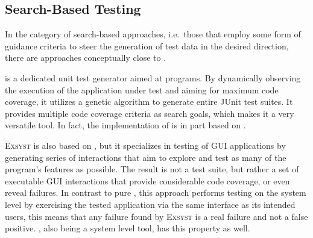 \subsection{Search-Based Testing}
In the category of search-based approaches, i.e.\ those that employ some form of guidance criteria to steer the
generation of test data in the desired direction, there are approaches conceptually close to \xmlmate.

\evosuite{}\cite{fraser2013whole} is a dedicated unit test generator aimed at \java programs. By
dynamically observing the execution of the application under test and aiming for maximum code coverage, it
utilizes a genetic algorithm to generate entire JUnit test suites. It provides multiple code coverage
criteria as search goals, which makes it a very versatile tool. In fact, the implementation of \xmlmate is
in part based on \evosuite.

\textsc{Exsyst}\cite{gross-issta2012} is also based on \evosuite, but it specializes in testing of \java
GUI applications by generating series of interactions that aim to explore and test as many of the program's
features as possible. The result is not a test suite, but rather a set of executable GUI interactions that
provide considerable code coverage, or even reveal failures. In contrast to pure \evosuite, this approach
performs testing on the system level by exercising the tested application via the same interface as its
intended users, this means that any failure found by \textsc{Exsyst} is a real failure and not a false
positive. \xmlmate, also being a system level tool, has this property as well.